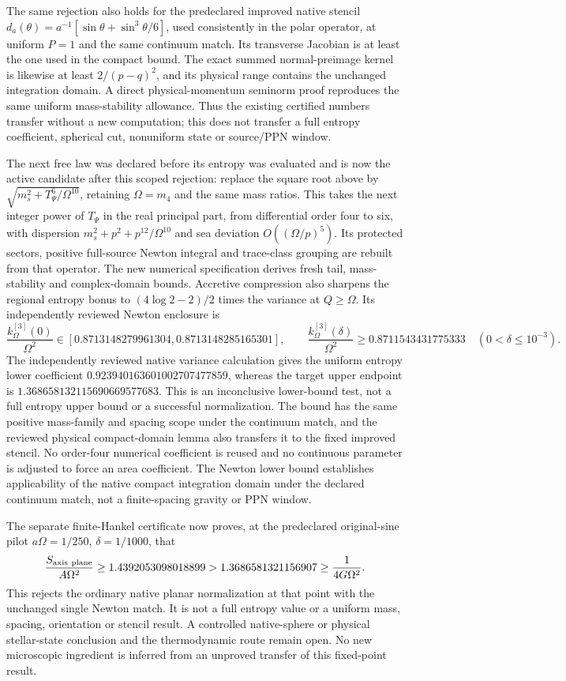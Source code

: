 The same rejection also holds for the predeclared improved native
stencil $d_a(\theta)=a^{-1}[\sin\theta+\sin^3\theta/6]$, used
consistently in the polar operator, at uniform $P=1$ and the same
continuum match. Its transverse Jacobian is at least the one used in
the compact bound. The exact summed normal-preimage kernel is likewise
at least $2/(p-q)^2$, and its physical range contains the unchanged
integration domain. A direct physical-momentum seminorm proof reproduces
the same uniform mass-stability allowance. Thus the existing certified
numbers transfer without a new computation; this does not transfer a
full entropy coefficient, spherical cut, nonuniform state or source/PPN
window.

The next free law was declared before its entropy was evaluated and is
now the active candidate after this scoped rejection: replace the square
root above by
$\sqrt{m_s^2+T_\Psi^6/\Omega^{10}}$, retaining $\Omega=m_4$ and the
same mass ratios. This takes the next integer power of $T_\Psi$ in
the real principal part, from differential order four to six,
with dispersion $m_s^2+p^2+p^{12}/\Omega^{10}$ and sea deviation
$O((\Omega/p)^5)$. Its protected sectors, positive full-source Newton
integral and trace-class grouping are rebuilt from that operator.
The new numerical specification derives fresh tail, mass-stability and
complex-domain bounds. Accretive compression also sharpens the regional
entropy bonus to $(4\log2-2)/2$ times the variance at $Q\geq\Omega$.
Its independently reviewed Newton enclosure is
\[
 \frac{k^{[3]}_\Omega(0)}{\Omega^2}\in
 [0.8713148279961304,0.8713148285165301],\qquad
 \frac{k^{[3]}_\Omega(\delta)}{\Omega^2}\geq0.8711543431775333
 \quad(0<\delta\leq10^{-3}).
\]
The independently reviewed native variance calculation gives the uniform
entropy lower coefficient $0.923940163601002707477859$, whereas the
target upper endpoint is $1.368658132115690669577683$. This is an
inconclusive lower-bound test, not a full entropy upper bound or a
successful normalization.
The bound has the same positive mass-family and spacing scope under
the continuum match, and the reviewed physical compact-domain lemma
also transfers it to the fixed improved stencil. No order-four numerical
coefficient is reused and no continuous parameter is adjusted to force
an area coefficient. The Newton lower bound establishes applicability
of the native compact integration domain under the declared continuum
match, not a finite-spacing gravity or PPN window.

The separate finite-Hankel certificate now proves, at the predeclared
original-sine pilot $a\Omega=1/250$, $\delta=1/1000$, that
\[
 \frac{S_{\rm axis\ plane}}{A\Omega^2}
 \geq1.4392053098018899
 >1.3686581321156907\geq\frac1{4G\Omega^2}.
\]
This rejects the ordinary native planar normalization at that point
with the unchanged single Newton match. It is not a full entropy value
or a uniform mass, spacing, orientation or stencil result. A controlled
native-sphere or physical stellar-state conclusion and the thermodynamic
route remain open. No new microscopic ingredient is inferred from an
unproved transfer of this fixed-point result.


